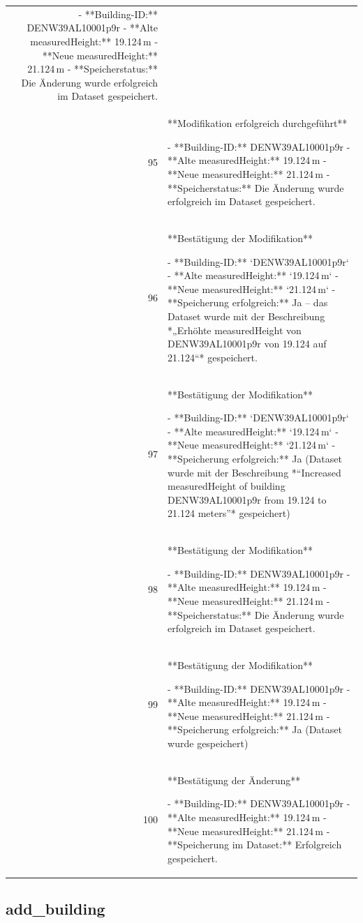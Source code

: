 \documentclass[a4paper,11pt]{article}
\begin{document}
\begin{table}[ht]
\begin{tabular}{r p{12cm}}
- **Building-ID:** DENW39AL10001p9r  
- **Alte measuredHeight:** 19.124 m  
- **Neue measuredHeight:** 21.124 m  
- **Speicherstatus:** Die Änderung wurde erfolgreich im Dataset gespeichert. \\
95 & **Modifikation erfolgreich durchgeführt**

- **Building-ID:** DENW39AL10001p9r  
- **Alte measuredHeight:** 19.124 m  
- **Neue measuredHeight:** 21.124 m  
- **Speicherstatus:** Die Änderung wurde erfolgreich im Dataset gespeichert. \\
96 & **Bestätigung der Modifikation**

- **Building-ID:** `DENW39AL10001p9r`  
- **Alte measuredHeight:** `19.124 m`  
- **Neue measuredHeight:** `21.124 m`  
- **Speicherung erfolgreich:** Ja – das Dataset wurde mit der Beschreibung *„Erhöhte measuredHeight von DENW39AL10001p9r von 19.124 auf 21.124“* gespeichert. \\
97 & **Bestätigung der Modifikation**

- **Building-ID:** `DENW39AL10001p9r`
- **Alte measuredHeight:** `19.124 m`
- **Neue measuredHeight:** `21.124 m`
- **Speicherung erfolgreich:** Ja (Dataset wurde mit der Beschreibung *“Increased measuredHeight of building DENW39AL10001p9r from 19.124 to 21.124 meters”* gespeichert) \\
98 & **Bestätigung der Modifikation**

- **Building-ID:** DENW39AL10001p9r  
- **Alte measuredHeight:** 19.124 m  
- **Neue measuredHeight:** 21.124 m  
- **Speicherstatus:** Die Änderung wurde erfolgreich im Dataset gespeichert. \\
99 & **Bestätigung der Modifikation**

- **Building-ID:** DENW39AL10001p9r  
- **Alte measuredHeight:** 19.124 m  
- **Neue measuredHeight:** 21.124 m  
- **Speicherung erfolgreich:** Ja (Dataset wurde gespeichert) \\
100 & **Bestätigung der Änderung**

- **Building-ID:** DENW39AL10001p9r  
- **Alte measuredHeight:** 19.124 m  
- **Neue measuredHeight:** 21.124 m  
- **Speicherung im Dataset:** Erfolgreich gespeichert. \\
\hline
\end{tabular}
\end{table}

\clearpage
\subsection{add\_building}
\end{document}
